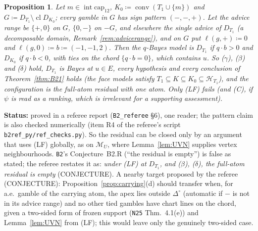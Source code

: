 \documentclass[11pt]{article}
\newtheorem{proposition}[theorem]{Proposition}
\theoremstyle{definition}
\theoremstyle{remark}
\newcommand{\Di}{\Delta^{\circ}}
\newcommand{\M}{\mathcal M}
\newcommand{\cl}{\operatorname{cl}}
\newcommand{\co}{\operatorname{conv}}
\newcommand{\src}[1]{\texttt{#1}}
\newcommand{\status}[1]{\par\smallskip\noindent\textbf{Status:} #1\par\smallskip}
\begin{document}
\begin{proposition}\label{prop:B2ex}
Let $m\in\operatorname{int}\mathrm{cap}_{12}$, $K_0\coloneqq\co(T_1\cup\{m\})$ and $G\coloneqq D_{T_1}\setminus\cl D_{K_0}$; every gamble in $G$ has sign pattern $(-,-,+)$. Let the advice range be $\{+,0\}$ on $G$, $\{0,-\}$ on $-G$, and elsewhere the single advice of $D_{T_1}$ (a decomposable domain, Remark~\ref{rem:advicerange}), and on $G$ put $\ell(g,+)\coloneqq0$ and $\ell(g,0)\coloneqq b\coloneqq(-1,-1,2)$. Then the $q$-Bayes model is $D_{T_1}$ if $q\cdot b>0$ and $D_{K_0}$ if $q\cdot b<0$, with ties on the chord $\{q\cdot b=0\}$, which contains $u$. So ($\gamma$), ($\beta$) and ($\delta$) hold, $D_{T_1}$ is Bayes at $u\in E$, every hypothesis and every conclusion of Theorem~\ref{thm:B21} holds (the face models satisfy $T_1\subseteq K\subseteq K_0\subseteq\mathcal H_{T_1}$), and the configuration is the full-atom residual with one atom. Only (LF) fails (and (C), if $\psi$ is read as a ranking, which is irrelevant for a supporting assessment).
\end{proposition}
\status{proved in a referee report (\src{B2\_referee} \S6), one reader; the pattern claim is also checked numerically (item R4 of the referee's script \src{b2ref\_py/ref\_checks.py}). So the residual can be closed only by an argument that uses (LF) globally, as on $\M_U$, where Lemma~\ref{lem:UVN} supplies vertex neighbourhoods. \src{B2}'s Conjecture~B2.R (``the residual is empty'') is false as stated; the referee restates it as: \emph{under (LF) at $D_{T_1}$, and ($\beta$), ($\delta$), the full-atom residual is empty} (CONJECTURE). A nearby target proposed by the referee (CONJECTURE): Proposition~\ref{prop:carrying}(d) should transfer when, for a.e.\ gamble of the carrying atom, the apex lies outside $\Di$ (automatic if $-$ is not in its advice range) and no other tied gambles have chart lines on the chord, given a two-sided form of frozen support (\src{N25} Thm.~4.1(e)) and Lemma~\ref{lem:UVN} from (LF); this would leave only the genuinely two-sided case.}
\end{document}
